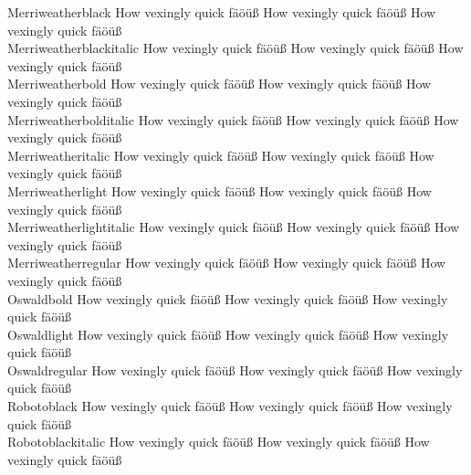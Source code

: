 \begin{tabbing}
Merriweatherblack \> {\mktsStyleNormal{}How vexingly quick fäöüß} {\Merriweatherblack{}How vexingly quick fäöüß} {\mktsStyleItalic{}How vexingly quick fäöüß} \\
Merriweatherblackitalic \> {\mktsStyleNormal{}How vexingly quick fäöüß} {\Merriweatherblackitalic{}How vexingly quick fäöüß} {\mktsStyleItalic{}How vexingly quick fäöüß} \\
Merriweatherbold \> {\mktsStyleNormal{}How vexingly quick fäöüß} {\Merriweatherbold{}How vexingly quick fäöüß} {\mktsStyleItalic{}How vexingly quick fäöüß} \\
Merriweatherbolditalic \> {\mktsStyleNormal{}How vexingly quick fäöüß} {\Merriweatherbolditalic{}How vexingly quick fäöüß} {\mktsStyleItalic{}How vexingly quick fäöüß} \\
Merriweatheritalic \> {\mktsStyleNormal{}How vexingly quick fäöüß} {\Merriweatheritalic{}How vexingly quick fäöüß} {\mktsStyleItalic{}How vexingly quick fäöüß} \\
Merriweatherlight \> {\mktsStyleNormal{}How vexingly quick fäöüß} {\Merriweatherlight{}How vexingly quick fäöüß} {\mktsStyleItalic{}How vexingly quick fäöüß} \\
Merriweatherlightitalic \> {\mktsStyleNormal{}How vexingly quick fäöüß} {\Merriweatherlightitalic{}How vexingly quick fäöüß} {\mktsStyleItalic{}How vexingly quick fäöüß} \\
Merriweatherregular \> {\mktsStyleNormal{}How vexingly quick fäöüß} {\Merriweatherregular{}How vexingly quick fäöüß} {\mktsStyleItalic{}How vexingly quick fäöüß} \\
Oswaldbold \> {\mktsStyleNormal{}How vexingly quick fäöüß} {\Oswaldbold{}How vexingly quick fäöüß} {\mktsStyleItalic{}How vexingly quick fäöüß} \\
Oswaldlight \> {\mktsStyleNormal{}How vexingly quick fäöüß} {\Oswaldlight{}How vexingly quick fäöüß} {\mktsStyleItalic{}How vexingly quick fäöüß} \\
Oswaldregular \> {\mktsStyleNormal{}How vexingly quick fäöüß} {\Oswaldregular{}How vexingly quick fäöüß} {\mktsStyleItalic{}How vexingly quick fäöüß} \\
Robotoblack \> {\mktsStyleNormal{}How vexingly quick fäöüß} {\Robotoblack{}How vexingly quick fäöüß} {\mktsStyleItalic{}How vexingly quick fäöüß} \\
Robotoblackitalic \> {\mktsStyleNormal{}How vexingly quick fäöüß} {\Robotoblackitalic{}How vexingly quick fäöüß} {\mktsStyleItalic{}How vexingly quick fäöüß} \\

\end{tabbing}
